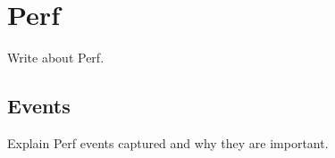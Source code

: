 \section{Perf}

Write about Perf.

\subsection{Events}

Explain Perf events captured and why they are important.
